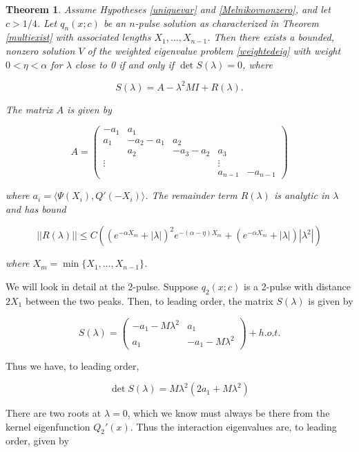 \documentclass[12pt]{article}
\newtheorem{theorem}{Theorem}
\begin{document}
\begin{theorem}\label{multistab}
Assume Hypotheses \ref{uniquevar} and \ref{Melnikovnonzero}, and let $c > 1/4$. Let $q_n(x; c)$ be an $n$-pulse solution as characterized in Theorem \ref{multiexist} with associated lengths $X_1, \dots, X_{n-1}$. Then there exists a bounded, nonzero solution $V$ of the weighted eigenvalue problem \eqref{weightedeig} with weight $0 < \eta < \alpha$ for $\lambda$ close to 0 if and only if $\det S(\lambda) = 0$, where

\[
S(\lambda) = A - \lambda^2 M I + R(\lambda).
\]

The matrix $A$ is given by

\begin{equation}\label{defA}
A = \begin{pmatrix}
-a_1 & a_1 \\
a_1 & -a_2 - a_1 & a_2 \\
& a_2 & -a_3 - a_2 & a_3 \\
\vdots & & & \vdots \\
& & & a_{n-1} & -a_{n-1} 
\end{pmatrix}
\end{equation}

where $a_i = \langle \Psi(X_i), Q'(-X_i) \rangle$. The remainder term $R(\lambda)$ is analytic in $\lambda$ and has bound

\begin{equation}
||R(\lambda)|| \leq C 
\left( (e^{-\alpha X_m} + |\lambda|)^2 e^{-(\alpha - \eta)X_m}  
+ (e^{-\alpha X_m} + |\lambda| )|\lambda^2| \right)
\end{equation}

where $X_m = \min\{X_1, \dots, X_{n-1}\}$.

\end{theorem}

We will look in detail at the 2-pulse. Suppose $q_2(x; c)$ is a 2-pulse with distance $2 X_1$ between the two peaks. Then, to leading order, the matrix $S(\lambda)$ is given by

\[
S(\lambda) = \begin{pmatrix}
-a_1 - M \lambda^2 & a_1  \\
a_1 & -a_1 - M \lambda^2
\end{pmatrix} + h.o.t.
\]

Thus we have, to leading order,

\[
\det S(\lambda) = M \lambda^2 (2 a_1 + M \lambda^2)
\]

There are two roots at $\lambda = 0$, which we know must always be there from the kernel eigenfunction $Q_2'(x)$. Thus the interaction eigenvalues are, to leading order, given by
\end{document}
